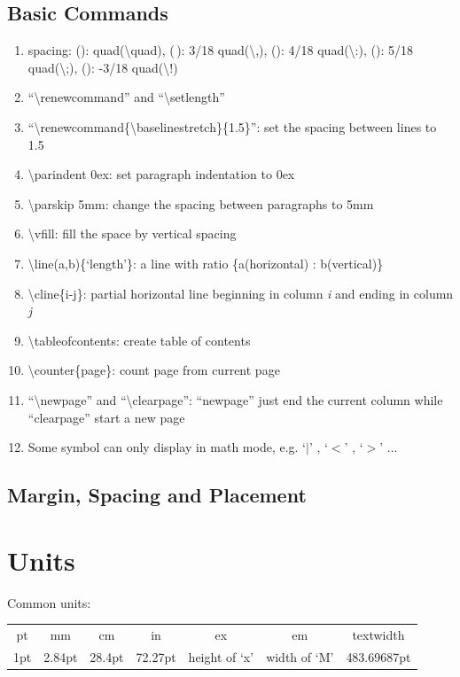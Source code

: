 \documentclass[10pt,a4paper,fleqn]{article}
\def\bslash{\textbackslash} %
\begin{document}
\subsection{Basic Commands}
\begin{enumerate}
\item spacing: (\quad): quad(\bslash quad), (\,): 3/18 quad(\bslash ,), (\:): 4/18 quad(\bslash :), (\;): 5/18 quad(\bslash ;), (\!): -3/18 quad(\bslash !)
\item ``\bslash renewcommand'' and ``\bslash setlength''
\item ``\bslash renewcommand\{\bslash baselinestretch\}\{1.5\}'': set the spacing between lines to 1.5
\item \bslash parindent 0ex:  set paragraph indentation to 0ex
\item \bslash parskip 5mm:  change the spacing between paragraphs to 5mm
\item \bslash vfill: fill the space by vertical spacing
\item \bslash line(a,b)\{`length'\}: a line with ratio \{a(horizontal) : b(vertical)\} 
\item \bslash cline\{i-j\}: partial horizontal line beginning in column \textit{i} and ending in column \textit{j}
\item \bslash tableofcontents: create table of contents
\item\bslash counter\{page\}: count page from current page
\item ``\bslash newpage'' and ``\bslash clearpage'': ``newpage'' just end the current column while ``clearpage'' start a new page
\item Some symbol can only display in math mode, e.g. `$|$' , `$<$' , `$>$' ...
\end{enumerate}
\subsection{Margin, Spacing and Placement}
\pagebreak

\section{Units}
Common units:
\begin{tabular}[c]{|ccccccc|}
\hline
pt & mm & cm & in & ex & em & textwidth\\	
1pt & 2.84pt & 28.4pt & 72.27pt & height of `x' & width of `M' & 483.69687pt \\
\hline
\end{tabular}
\end{document}
